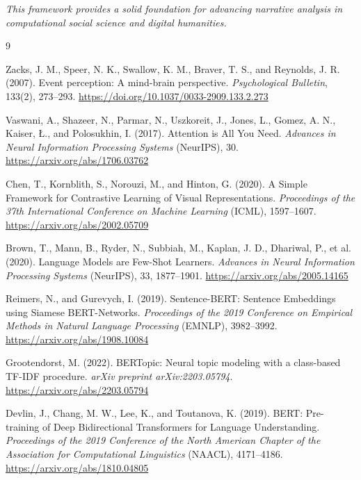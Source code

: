 \documentclass[12pt]{article}
\begin{document}
\vspace{1cm}

\begin{center}
\textit{This framework provides a solid foundation for advancing narrative analysis in computational social science and digital humanities.}
\end{center}

\newpage

\begin{thebibliography}{9}

Zacks, J. M., Speer, N. K., Swallow, K. M., Braver, T. S., and Reynolds, J. R. (2007).
Event perception: A mind-brain perspective.
\textit{Psychological Bulletin}, 133(2), 273--293.
\url{https://doi.org/10.1037/0033-2909.133.2.273}

Vaswani, A., Shazeer, N., Parmar, N., Uszkoreit, J., Jones, L., Gomez, A. N., Kaiser, Ł., and Polosukhin, I. (2017).
Attention is All You Need.
\textit{Advances in Neural Information Processing Systems} (NeurIPS), 30.
\url{https://arxiv.org/abs/1706.03762}

Chen, T., Kornblith, S., Norouzi, M., and Hinton, G. (2020).
A Simple Framework for Contrastive Learning of Visual Representations.
\textit{Proceedings of the 37th International Conference on Machine Learning} (ICML), 1597--1607.
\url{https://arxiv.org/abs/2002.05709}

Brown, T., Mann, B., Ryder, N., Subbiah, M., Kaplan, J. D., Dhariwal, P., et al. (2020).
Language Models are Few-Shot Learners.
\textit{Advances in Neural Information Processing Systems} (NeurIPS), 33, 1877--1901.
\url{https://arxiv.org/abs/2005.14165}

Reimers, N., and Gurevych, I. (2019).
Sentence-BERT: Sentence Embeddings using Siamese BERT-Networks.
\textit{Proceedings of the 2019 Conference on Empirical Methods in Natural Language Processing} (EMNLP), 3982--3992.
\url{https://arxiv.org/abs/1908.10084}

Grootendorst, M. (2022).
BERTopic: Neural topic modeling with a class-based TF-IDF procedure.
\textit{arXiv preprint arXiv:2203.05794}.
\url{https://arxiv.org/abs/2203.05794}

Devlin, J., Chang, M. W., Lee, K., and Toutanova, K. (2019).
BERT: Pre-training of Deep Bidirectional Transformers for Language Understanding.
\textit{Proceedings of the 2019 Conference of the North American Chapter of the Association for Computational Linguistics} (NAACL), 4171--4186.
\url{https://arxiv.org/abs/1810.04805}


\end{thebibliography}
\end{document}
